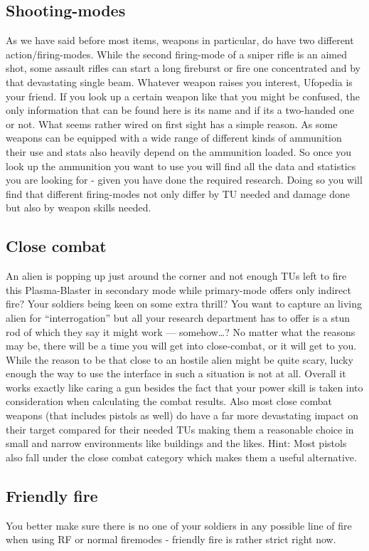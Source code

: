 \subsection{Shooting-modes}
As we have said before most items, weapons in particular, do have two different action/firing-modes. While the second firing-mode of a sniper rifle is an aimed shot, some assault rifles can start a long fireburst or fire one concentrated and by that devastating single beam. Whatever weapon raises you interest, Ufopedia is your friend. If you look up a certain weapon like that you might be confused, the only information that can be found here is its name and if its a two-handed one or not. What seems rather wired on first sight has a simple reason. As some weapons can be equipped with a wide range of different kinds of ammunition their use and stats also heavily depend on the ammunition loaded. So once you look up the ammunition you want to use you will find all the data and statistics you are looking for - given you have done the required research. Doing so you will find that different firing-modes not only differ by TU needed and damage done but also by weapon skills needed.

\subsection{Close combat}
An alien is popping up just around the corner and not enough TUs left to fire this Plasma-Blaster in secondary mode while primary-mode offers only indirect fire? Your soldiers being keen on some extra thrill? You want to capture an living alien for ``interrogation'' but all your research department has to offer is a stun rod of which they say it might work --- somehow\ldots? No matter what the reasons may be, there will be a time you will get into close-combat, or it will get to you. While the reason to be that close to an hostile alien might be quite scary, lucky enough the way to use the interface in such a situation is not at all. Overall it works exactly like caring a gun besides the fact that your power skill is taken into consideration when calculating the combat results. Also most close combat weapons (that includes pistols as well) do have a far more devastating impact on their target compared for their needed TUs making them a reasonable choice in small and narrow environments like buildings and the likes. Hint: Most pistols also fall under the close combat category which makes them a useful alternative.

\subsection{Friendly fire}
You better make sure there is no one of your soldiers in any possible line of fire when using RF or normal firemodes - friendly fire is rather strict right now.


